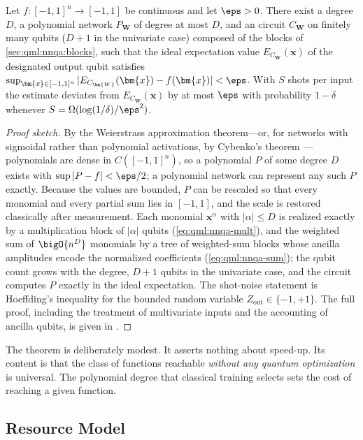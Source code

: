 \begin{theorem}\label{thm:qml:nnqa-ua}
Let $f \colon [-1,1]^n \to [-1,1]$ be continuous and let $\eps > 0$. There exist a degree $D$, a polynomial network $P_{\bm{W}}$ of degree at most $D$, and an \nnqa{} circuit $C_{\bm{W}}$ on finitely many qubits ($D+1$ in the univariate case) composed of the blocks of \cref{sec:qml:nnqa:blocks}, such that the ideal expectation value $E_{C_{\bm{W}}}(\bm{x})$ of the designated output qubit satisfies $\sup_{\bm{x} \in [-1,1]^n} |E_{C_{\bm{W}}}(\bm{x}) - f(\bm{x})| < \eps$. With $S$ shots per input the estimate deviates from $E_{C_{\bm{W}}}(\bm{x})$ by at most $\eps$ with probability $1 - \delta$ whenever $S = \Omega(\log(1/\delta)/\eps^2)$.
\end{theorem}

\begin{proof}[Proof sketch]
By the Weierstrass approximation theorem---or, for networks with sigmoidal rather than polynomial activations, by Cybenko's theorem \cite{cybenko1989approximation}---polynomials are dense in $C([-1,1]^n)$, so a polynomial $P$ of some degree $D$ exists with $\sup |P - f| < \eps/2$; a polynomial network can represent any such $P$ exactly. Because the values are bounded, $P$ can be rescaled so that every monomial and every partial sum lies in $[-1,1]$, and the scale is restored classically after measurement. Each monomial $\bm{x}^\alpha$ with $|\alpha| \le D$ is realized exactly by a multiplication block of $|\alpha|$ qubits (\cref{eq:qml:nnqa-mult}), and the weighted sum of $\bigO{n^D}$ monomials by a tree of weighted-sum blocks whose ancilla amplitudes encode the normalized coefficients (\cref{eq:qml:nnqa-sum}); the qubit count grows with the degree, $D+1$ qubits in the univariate case, and the circuit computes $P$ exactly in the ideal expectation. The shot-noise statement is Hoeffding's inequality for the bounded random variable $Z_{\mathrm{out}} \in \{-1,+1\}$. The full proof, including the treatment of multivariate inputs and the accounting of ancilla qubits, is given in \cite{guo2026nnqa}.
\end{proof}

The theorem is deliberately modest. It asserts nothing about speed-up. Its content is that the class of functions reachable \emph{without any quantum optimization} is universal. The polynomial degree that classical training selects sets the cost of reaching a given function.

\subsection{Resource Model}\label{sec:qml:nnqa:resources}

